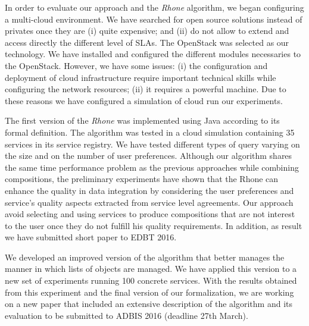 \documentclass[11pt,a4paper,oneside]{report}
\begin{document}
In order to evaluate our approach and the \textit{Rhone} algorithm, we began configuring a multi-cloud environment. We have searched for open source solutions instead of privates once they are (i) quite expensive; and (ii) do not allow to extend and access directly the different level of SLAs. The OpenStack was selected as our technology. We have installed and configured the different modules necessaries to the OpenStack. However, we have some issues: (i) the configuration and deployment of cloud infrastructure require important technical skills while configuring the network resources; (ii) it requires a powerful machine. Due to these reasons we have configured a simulation of cloud run our experiments.

The first version of the \textit{Rhone} was implemented using Java according to its formal definition. The algorithm was tested in a cloud simulation containing 35 services in its service registry. We have tested different types of query varying on the size and on the number of user preferences. Although our algorithm shares the same time performance problem as the previous approaches while combining compositions, the preliminary experiments have shown that the Rhone can enhance the quality in data integration by considering the user preferences and service’s quality aspects extracted from service level agreements. Our approach avoid selecting and using services to produce compositions that are not interest to the user once they do not fulfill his quality requirements. In addition, as result we have submitted short paper to EDBT 2016. 

We developed an improved version of the algorithm that better manages the manner in which lists of objects are managed. We have applied this version to a new set of experiments running 100 concrete services. With the results obtained from this experiment and the final version of our formalization, we are working on a new paper that included an extensive description of the algorithm and its evaluation to be submitted to ADBIS 2016 (deadline 27th March).
\end{document}
